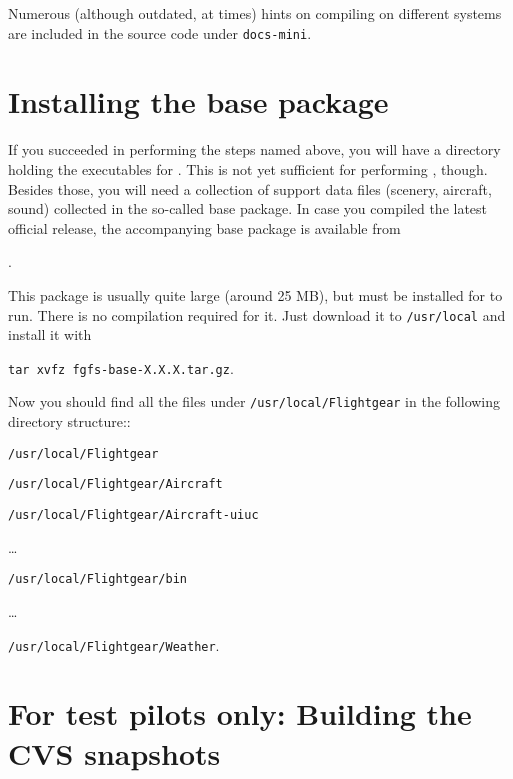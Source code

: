 Numerous (although outdated, at times) hints on compiling on different systems are included in the source code under \texttt{docs-mini}.

\section{Installing the base package}

If you succeeded in performing the steps named above, you will have a directory holding the
executables for \FlightGear{}$\!$. This is not yet sufficient for performing
\FlightGear{}$\!$, though. Besides those, you will need a collection of support data
files (scenery, aircraft, sound) collected in the so-called base package. In case you
compiled the latest official release, the accompanying base package is available from
 \medskip

.

This package is usually quite large (around 25 MB), but
must be installed for \FlightGear{} to run. There is no compilation required for it. Just download it to \texttt{/usr/local} and install it with
 \medskip

    \texttt{tar xvfz fgfs-base-X.X.X.tar.gz}.

 \noindent
Now you should find all the \FlightGear{} files under \texttt{/usr/local/Flightgear} in the
following directory structure::
\medskip

 \texttt{/usr/local/Flightgear}

 \texttt{/usr/local/Flightgear/Aircraft}

 \texttt{/usr/local/Flightgear/Aircraft-uiuc}

 \ldots

 \texttt{/usr/local/Flightgear/bin}

 \ldots

 \texttt{/usr/local/Flightgear/Weather}.


\section{For test pilots only: Building the CVS snapshots}

